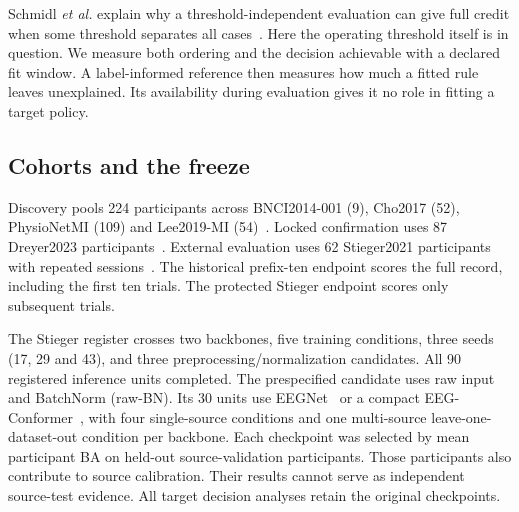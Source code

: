 \documentclass[conference,letterpaper]{IEEEtran}
\begin{document}
Schmidl \emph{et al.} explain why a threshold-independent evaluation can give full credit when some threshold separates all cases~\cite{tschmidl}. Here the operating threshold itself is in question. We measure both ordering and the decision achievable with a declared fit window. A label-informed reference then measures how much a fitted rule leaves unexplained. Its availability during evaluation gives it no role in fitting a target policy.

\subsection{Cohorts and the freeze}
Discovery pools 224 participants across BNCI2014-001 (9), Cho2017 (52), PhysioNetMI (109) and Lee2019-MI (54)~\cite{tangermann2012,cho2017,schalk2009,lee2019}. Locked confirmation uses 87 Dreyer2023 participants~\cite{dreyer2023}. External evaluation uses 62 Stieger2021 participants with repeated sessions~\cite{stieger2021}. The historical prefix-ten endpoint scores the full record, including the first ten trials. The protected Stieger endpoint scores only subsequent trials.

The Stieger register crosses two backbones, five training conditions, three seeds (17, 29 and 43), and three preprocessing/normalization candidates. All 90 registered inference units completed. The prespecified candidate uses raw input and BatchNorm (raw-BN). Its 30 units use EEGNet~\cite{lawhern2018} or a compact EEG-Conformer~\cite{song2023}, with four single-source conditions and one multi-source leave-one-dataset-out condition per backbone. Each checkpoint was selected by mean participant BA on held-out source-validation participants. Those participants also contribute to source calibration. Their results cannot serve as independent source-test evidence. All target decision analyses retain the original checkpoints.







\end{document}
